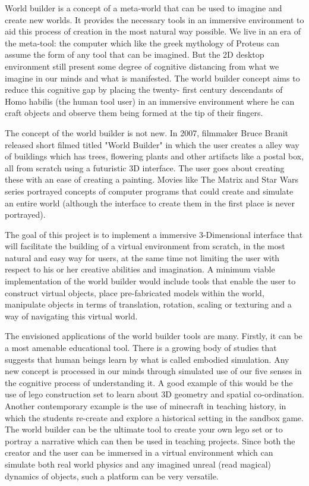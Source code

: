 World builder is a concept of a meta-world that can be used to imagine and create new worlds. It provides the necessary tools in an immersive
 environment to aid this process of creation in the most natural way possible. We live in an era of the meta-tool: the computer which like the greek 
 mythology of Proteus can assume the form of any tool that can be imagined. But the 2D desktop environment still present some degree of cognitive 
 distancing from what we imagine in our minds and what is manifested. The world builder concept aims to reduce this cognitive gap by placing the twenty-
 first century descendants of Homo habilis (the human tool user) in an immersive environment where he can craft objects and observe them being formed at
  the tip of their fingers.


The concept of the world builder is not new. In 2007, filmmaker Bruce Branit released short filmed titled "World Builder" in which the user creates a 
alley way of buildings which has trees, flowering plants and other artifacts like a postal box, all from scratch using a futuristic 3D interface. The 
user goes about creating these with an ease of creating a painting. Movies like The Matrix and Star Wars series portrayed concepts of computer programs
 that could create and simulate an entire world (although the interface to create them in the first place is never portrayed).


The goal of this project is to implement a immersive 3-Dimensional interface that will facilitate the building of a virtual environment from scratch, in
 the most natural and easy way for users, at the same time not limiting the user with respect to his or her creative abilities and imagination. A 
 minimum viable implementation of the world builder would include tools that enable the user to construct virtual objects, place pre-fabricated models 
 within the world, manipulate objects in terms of translation, rotation, scaling or texturing and a way of navigating this virtual world.



The envisioned applications of the world builder tools are many. Firstly, it can be a most amenable educational tool. There is a growing body of studies 
that suggests that human beings learn by what is called embodied simulation. Any new concept is processed in our minds through simulated use of our five
 senses in the cognitive process of understanding it. A good example of this would be the use of lego construction set to learn about 3D geometry and 
 spatial co-ordination.  Another contemporary example is the use of minecraft in teaching history, in which the students re-create and explore a 
 historical setting in the sandbox game. The world builder can be the ultimate tool to create your own lego set or to portray a narrative which can then
  be used in teaching projects. Since both the creator and the user can be immersed in a virtual environment which can simulate both real world physics 
  and any imagined unreal (read magical) dynamics of objects, such a platform can be very versatile. 


